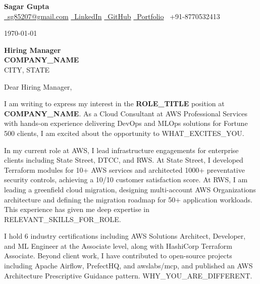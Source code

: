 \documentclass[a4paper,11pt]{article}
\begin{document}
\noindent
\textbf{\Large Sagar Gupta} \\[2pt]
\small{%
\href{mailto:sg85207@gmail.com}{\faSend\ sg85207@gmail.com} \hspace{2mm}
\href{https://www.linkedin.com/in/sagar-gupta-16-10/}{\faLinkedinSquare\ LinkedIn} \hspace{2mm}
\href{https://github.com/Sagargupta16}{\faGithub\ GitHub} \hspace{2mm}
\href{https://sagargupta.online/portfolio-react/}{\faGlobe\ Portfolio} \hspace{2mm}
\faPhone\ +91-8770532413
}

\vspace{6mm}
\noindent
\today

\vspace{4mm}
\noindent
\textbf{Hiring Manager} \\
\textbf{COMPANY\_NAME} \\
CITY, STATE

\vspace{6mm}
\noindent
Dear Hiring Manager,

\vspace{3mm}
\noindent
I am writing to express my interest in the \textbf{ROLE\_TITLE} position at \textbf{COMPANY\_NAME}. As a Cloud Consultant at AWS Professional Services with hands-on experience delivering DevOps and MLOps solutions for Fortune 500 clients, I am excited about the opportunity to WHAT\_EXCITES\_YOU.

\vspace{3mm}
\noindent
In my current role at AWS, I lead infrastructure engagements for enterprise clients including State Street, DTCC, and RWS. At State Street, I developed Terraform modules for 10+ AWS services and architected 1000+ preventative security controls, achieving a 10/10 customer satisfaction score. At RWS, I am leading a greenfield cloud migration, designing multi-account AWS Organizations architecture and defining the migration roadmap for 50+ application workloads. This experience has given me deep expertise in RELEVANT\_SKILLS\_FOR\_ROLE.

\vspace{3mm}
\noindent
I hold 6 industry certifications including AWS Solutions Architect, Developer, and ML Engineer at the Associate level, along with HashiCorp Terraform Associate. Beyond client work, I have contributed to open-source projects including Apache Airflow, PrefectHQ, and awslabs/mcp, and published an AWS Architecture Prescriptive Guidance pattern. WHY\_YOU\_ARE\_DIFFERENT.
\end{document}
